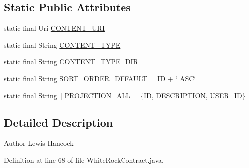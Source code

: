 \subsection*{Static Public Attributes}
\begin{DoxyCompactItemize}
\item 
static final Uri \hyperlink{classuk_1_1ac_1_1swan_1_1digitaltrails_1_1database_1_1_white_rock_contract_1_1_content_report_a5475a0f8f00134d483a06f637a9fa769}{C\+O\+N\+T\+E\+N\+T\+\_\+\+U\+R\+I}
\item 
static final String \hyperlink{classuk_1_1ac_1_1swan_1_1digitaltrails_1_1database_1_1_white_rock_contract_1_1_content_report_aa265b8b8f750b72307aff0fdd0e24d6d}{C\+O\+N\+T\+E\+N\+T\+\_\+\+T\+Y\+P\+E}
\item 
static final String \hyperlink{classuk_1_1ac_1_1swan_1_1digitaltrails_1_1database_1_1_white_rock_contract_1_1_content_report_a766b9c019f286d4c9c8fc4b9a4114e31}{C\+O\+N\+T\+E\+N\+T\+\_\+\+T\+Y\+P\+E\+\_\+\+D\+I\+R}
\item 
static final String \hyperlink{classuk_1_1ac_1_1swan_1_1digitaltrails_1_1database_1_1_white_rock_contract_1_1_content_report_a183c701ed689aacf52f517120604896a}{S\+O\+R\+T\+\_\+\+O\+R\+D\+E\+R\+\_\+\+D\+E\+F\+A\+U\+L\+T} = I\+D + \char`\"{} A\+S\+C\char`\"{}
\item 
static final String\mbox{[}$\,$\mbox{]} \hyperlink{classuk_1_1ac_1_1swan_1_1digitaltrails_1_1database_1_1_white_rock_contract_1_1_content_report_a1fb7a9d1909dccca84280e06bf20c113}{P\+R\+O\+J\+E\+C\+T\+I\+O\+N\+\_\+\+A\+L\+L} = \{I\+D, D\+E\+S\+C\+R\+I\+P\+T\+I\+O\+N, U\+S\+E\+R\+\_\+\+I\+D\}
\end{DoxyCompactItemize}


\subsection{Detailed Description}
\begin{DoxyAuthor}{Author}
Lewis Hancock 
\end{DoxyAuthor}


Definition at line 68 of file White\+Rock\+Contract.\+java.



